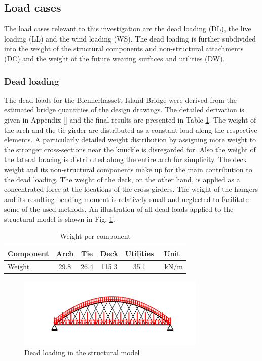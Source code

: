 \newpage
\subsection{Load cases} \label{sec:met_loads}
The load cases relevant to this investigation are the dead loading (DL), the live loading (LL) and the wind loading (WS). The dead loading is further subdivided into the weight of the structural components and non-structural attachments (DC) and the weight of the future wearing surfaces and utilities (DW).

\subsubsection{Dead loading}
The dead loads for the Blennerhassett Island Bridge were derived from the estimated bridge quantities of the design drawings. The detailed derivation is given in Appendix [] and the final results are presented in Table \ref{tab:dead_loads}. The weight of the arch and the tie girder are distributed as a constant load along the respective elements. A particularly detailed weight distribution by assigning more weight to the stronger cross-sections near the knuckle is disregarded for. Also the weight of the lateral bracing is distributed along the entire arch for simplicity. The deck weight and its non-structural components make up for the main contribution to the dead loading. The weight of the deck, on the other hand, is applied as a concentrated force at the locations of the cross-girders. The weight of the hangers and its resulting bending moment is relatively small and neglected to facilitate some of the used methods. An illustration of all dead loads applied to the structural model is shown in Fig. \ref{fig:dead_loads}.

\begin{table}[H]
    \centering
    \begin{tabular}{lccccc}
        Component & Arch & Tie & Deck & Utilities & Unit \\ \hline
        Weight & 29.8 & 26.4 & 115.3 & 35.1 & \SI{}{kN/m}
    \end{tabular}
    \caption{Weight per component}
    \label{tab:dead_loads}
\end{table}

\begin{figure}[H]
    \centering
    \includegraphics[trim={0 0.8cm 0 0.8cm},clip,
    width=0.8\textwidth]{illustrations/figures/permanent loads.png}
    \caption{Dead loading in the structural model}
    \label{fig:dead_loads}
\end{figure}

